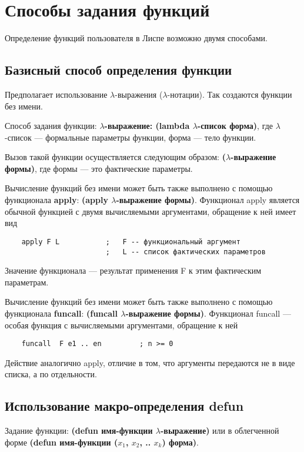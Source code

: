 \section{Способы задания функций}

Определение функций пользователя в Лиспе возможно двумя способами.

\subsection{Базисный способ определения функции}

Предполагает использование $\lambda$-выражения ($\lambda$-нотации). Так создаются функции без имени. 

Способ задания функции: \textbf{$\lambda$-выражение: (lambda $\lambda$-список форма)}, где $\lambda$-список --- формальные параметры функции, форма --- тело функции. 

Вызов такой функции осуществляется следующим образом: \textbf{($\lambda$-выражение формы)}, где формы --- это фактические параметры. 

Вычисление функций без имени может быть также выполнено с помощью функционала \textbf{apply}: \textbf{(apply $\lambda$-выражение формы)}. 
Функционал apply является обычной функцией с двумя вычисляемыми аргументами, обращение к ней имеет вид 
\begin{lstlisting}
    apply F L           ;   F -- функциональный аргумент 
                        ;   L -- список фактических параметров
\end{lstlisting}

Значение функционала --- результат применения F к этим фактическим параметрам.

Вычисление функций без имени может быть также выполнено с помощью функционала \textbf{funcall}: \textbf{(funcall $\lambda$-выражение формы)}. Функционал funcall --- особая функция с вычисляемыми аргументами, обращение к ней
\begin{lstlisting}
    funcall  F e1 .. en         ; n >= 0
\end{lstlisting}

Действие аналогично apply, отличие в том, что аргументы передаются не в виде списка, а по отдельности.

\subsection{Использование макро-определения defun}

Задание функции: \textbf{(defun имя-функции $\lambda$-выражение)} или в облегченной форме \textbf{(defun имя-функции ($x_1$, $x_2$, .. $x_k$) форма)}.

